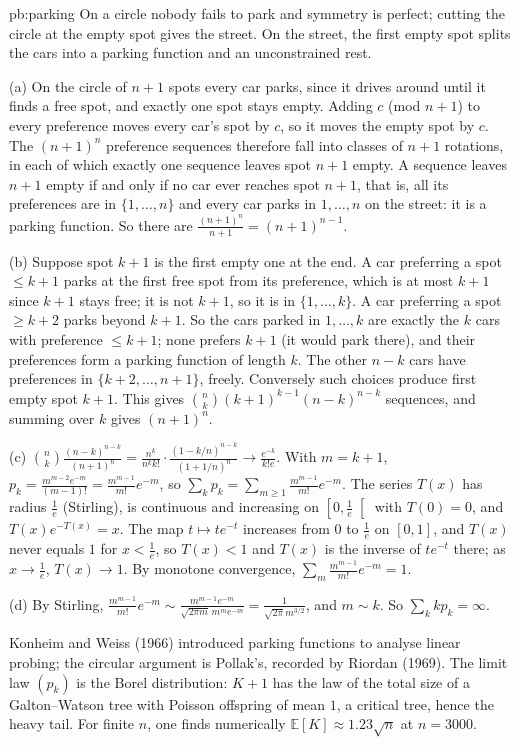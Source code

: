 \begin{solution}{pb:parking}
\idea On a circle nobody fails to park and symmetry is perfect; cutting the circle at the empty spot gives the street. On the street, the first empty spot splits the
cars into a parking function and an unconstrained rest.

\writeup (a) On the circle of $n+1$ spots every car parks, since it drives around until it finds a free spot, and exactly one spot stays empty. Adding $c$ (mod $n+1$) to every
preference moves every car's spot by $c$, so it moves the empty spot by $c$. The $(n+1)^n$ preference sequences therefore fall into classes of $n+1$ rotations,
in each of which exactly one sequence leaves spot $n+1$ empty. A sequence leaves $n+1$ empty if and only if no car ever reaches spot $n+1$, that is, all its preferences are in
$\{1,\dots,n\}$ and every car parks in $1,\dots,n$ on the street: it is a parking function. So there are $\frac{(n+1)^n}{n+1}=(n+1)^{n-1}$.

(b) Suppose spot $k+1$ is the first empty one at the end. A car preferring a spot $\le k+1$ parks at the first free spot from its preference, which is at most $k+1$ since
$k+1$ stays free; it is not $k+1$, so it is in $\{1,\dots,k\}$. A car preferring a spot $\ge k+2$ parks beyond $k+1$. So the cars parked in $1,\dots,k$ are exactly the
$k$ cars with preference $\le k+1$; none prefers $k+1$ (it would park there), and their preferences form a parking function of length $k$. The other $n-k$ cars have
preferences in $\{k+2,\dots,n+1\}$, freely. Conversely such choices produce first empty spot $k+1$. This gives $\binom nk(k+1)^{k-1}(n-k)^{n-k}$ sequences, and summing over $k$ gives
$(n+1)^n$.

(c) $\binom nk\frac{(n-k)^{n-k}}{(n+1)^n}=\frac{n^{\underline k}}{n^kk!}\cdot\frac{(1-k/n)^{n-k}}{(1+1/n)^n}\to\frac{e^{-k}}{k!e}$. With $m=k+1$, $p_k=\frac{m^{m-2}e^{-m}}{(m-1)!}=\frac{m^{m-1}}{m!}e^{-m}$, so $\sum_kp_k=\sum_{m\ge1}\frac{m^{m-1}}{m!}e^{-m}$. The series
$T(x)$ has radius $\frac1e$ (Stirling), is continuous and increasing on $\left[0,\frac1e\right[$ with $T(0)=0$, and $T(x)e^{-T(x)}=x$. The map $t\mapsto te^{-t}$ increases from $0$ to $\frac1e$ on $[0,1]$, and
$T(x)$ never equals $1$ for $x<\frac1e$, so $T(x)<1$ and $T(x)$ is the inverse of $te^{-t}$ there; as $x\to\frac1e$, $T(x)\to1$. By monotone convergence, $\sum_m\frac{m^{m-1}}{m!}e^{-m}=1$.

(d) By Stirling, $\frac{m^{m-1}}{m!}e^{-m}\sim\frac{m^{m-1}e^{-m}}{\sqrt{2\pi m}\,m^me^{-m}}=\frac1{\sqrt{2\pi}m^{3/2}}$, and $m\sim k$. So $\sum_kkp_k=\infty$.

\leads Konheim and Weiss (1966) introduced parking functions to analyse linear probing; the circular argument is Pollak's, recorded by Riordan (1969). The limit law
$(p_k)$ is the Borel distribution: $K+1$ has the law of the total size of a Galton--Watson tree with Poisson offspring of mean $1$, a critical tree, hence the heavy
tail. For finite $n$, one finds numerically $\mathbb E[K]\approx1.23\sqrt n$ at $n=3000$.
\end{solution}


